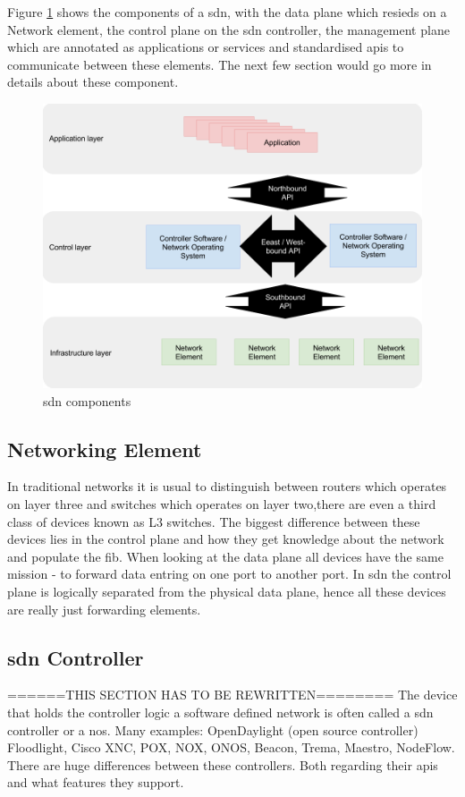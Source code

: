 \par
Figure \ref{fig:sdn_components} shows the components of a \gls{sdn}, with the data plane which resieds on a Network element, the control plane on the \gls{sdn} controller, the management plane which are annotated as applications or services and standardised \gls{api}s to communicate between these elements. The next few section would go more in details about these component. 


\begin{figure}
\includegraphics[width=5in]{content/img/sdn_components.png}
\caption{\gls{sdn} components}
\label{fig:sdn_components}
\end{figure} 


\subsection{Networking Element}
In traditional networks it is usual to distinguish between routers which operates on layer three and switches which operates on layer two,there are even a third class of devices known as L3 switches. The biggest difference between these devices lies in the control plane and how they get knowledge about the network and populate the \gls{fib}. When looking at the data plane all devices have the same mission - to forward data entring on one port to another port. In \gls{sdn} the control plane is logically separated from the physical data plane, hence all these devices are really just forwarding elements. 

\subsection{\gls{sdn} Controller}
======THIS SECTION HAS TO BE REWRITTEN========
The device that holds the controller logic a software defined network is often called a \gls{sdn} controller or a \gls{nos}. Many examples: OpenDaylight (open source controller) Floodlight, Cisco XNC, POX, NOX, ONOS, Beacon, Trema, Maestro, NodeFlow. There are huge differences between these controllers. Both regarding their \gls{api}s and what features they support.  



